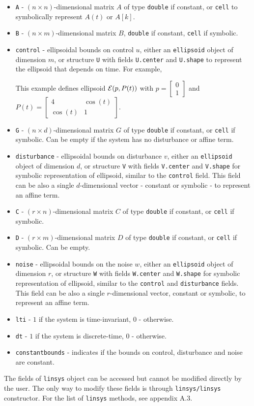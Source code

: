\documentclass{report}
\newcommand{\EE}{{\cal E}}
\begin{document}
\begin{itemize}
\item {\tt A} - $(n\times n)$-dimensional matrix $A$ of type {\tt double}
if constant, or {\tt cell} to symbolically represent $A(t)$ or $A[k]$.
\item {\tt B} - $(n\times m)$-dimensional matrix $B$, {\tt double} if constant,
{\tt cell} if symbolic.
\item {\tt control} - ellipsoidal bounds on control $u$,
either an {\tt ellipsoid}
object of dimension $m$, or structure {\tt U} with fields {\tt U.center} and
{\tt U.shape} to represent the ellipsoid that depends on time. For example,

This example defines ellipsoid $\EE(p, P(t))$ with $p=\left[\begin{array}{c}
0\\
1\end{array}\right]$ and $P(t) = \left[\begin{array}{cc}
4 & \cos(t)\\
\cos(t) & 1\end{array}\right]$.
\item {\tt G} - $(n\times d)$-dimensional matrix $G$ of type {\tt double}
if constant, or {\tt cell} if symbolic. Can be empty if the system has
no disturbance or affine term.
\item {\tt disturbance} - ellipsoidal bounds on disturbance $v$, either an
{\tt ellipsoid} object of dimension $d$, or structure {\tt V} with
fields {\tt V.center} and {\tt V.shape} for symbolic representation of
ellipsoid, similar to the {\tt control} field.
This field can be also a single $d$-dimensional vector - constant or symbolic -
to represent an affine term.
\item {\tt C} - $(r\times n)$-dimensional matrix $C$ of type {\tt double}
if constant, or {\tt cell} if symbolic.
\item {\tt D} - $(r\times m)$-dimensional matrix $D$ of type {\tt double}
if constant, or {\tt cell} if symbolic. Can be empty.
\item {\tt noise} - ellipsoidal bounds on the noise $w$, either an
{\tt ellipsoid} object of dimension $r$, or structure {\tt W} with
fields {\tt W.center} and {\tt W.shape} for symbolic representation of
ellipsoid, similar to the {\tt control} and {\tt disturbance} fields.
\newline
This field can be also a single $r$-dimensional vector, constant or symbolic,
to represent an affine term.
\item {\tt lti} - $1$ if the system is time-invariant, $0$ - otherwise.
\item {\tt dt} - $1$ if the system is discrete-time, $0$ - otherwise.
\item {\tt constantbounds} - indicates if the bounds on control, disturbance
and noise are constant.
\end{itemize}
The fields of {\tt linsys} object can be accessed but cannot be modified
directly by the user. The only way to modify these fields is through
{\tt linsys/linsys} constructor.
For the list of {\tt linsys} methods, see appendix A.3.
\end{document}
